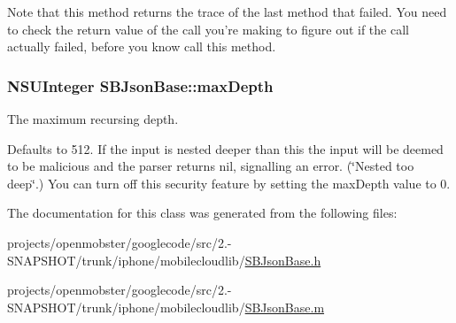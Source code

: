 \-Note that this method returns the trace of the last method that failed. \-You need to check the return value of the call you're making to figure out if the call actually failed, before you know call this method. \hypertarget{interface_s_b_json_base_abe3e47517711570a9a57e2d92a15055b}{
\subsubsection[{max\-Depth}]{\setlength{\rightskip}{0pt plus 5cm}\-N\-S\-U\-Integer \-S\-B\-Json\-Base\-::max\-Depth}}
\label{interface_s_b_json_base_abe3e47517711570a9a57e2d92a15055b}


\-The maximum recursing depth. 

\-Defaults to 512. \-If the input is nested deeper than this the input will be deemed to be malicious and the parser returns nil, signalling an error. (\char`\"{}\-Nested too deep\char`\"{}.) \-You can turn off this security feature by setting the max\-Depth value to 0. 

\-The documentation for this class was generated from the following files\-:\begin{DoxyCompactItemize}
\item 
projects/openmobster/googlecode/src/2.-\/\-S\-N\-A\-P\-S\-H\-O\-T/trunk/iphone/mobilecloudlib/\hyperlink{_s_b_json_base_8h}{\-S\-B\-Json\-Base.\-h}\item 
projects/openmobster/googlecode/src/2.-\/\-S\-N\-A\-P\-S\-H\-O\-T/trunk/iphone/mobilecloudlib/\hyperlink{_s_b_json_base_8m}{\-S\-B\-Json\-Base.\-m}\end{DoxyCompactItemize}
